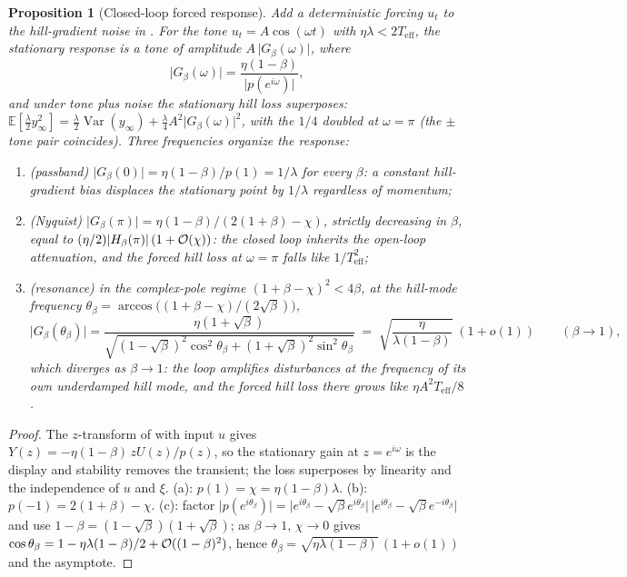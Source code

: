 \documentclass[11pt,a4paper]{article}
\newtheorem{proposition}{Proposition}
\theoremstyle{remark}
\newcommand{\Hmag}[1]{\lvert H_\beta(#1)\rvert}
\newcommand{\Teff}{T_{\mathrm{eff}}}
\begin{document}
\begin{proposition}[Closed-loop forced response]
\label{prop:forced}
Add a deterministic forcing $u_t$ to the hill-gradient noise in .
For the tone $u_t=A\cos(\omega t)$ with $\eta\lambda<2\Teff$, the stationary response is a tone of amplitude $A\,\lvert G_\beta(\omega)\rvert$, where
\[
\lvert G_\beta(\omega)\rvert=\frac{\eta(1-\beta)}{\lvert p(e^{i\omega})\rvert},
\]
and under tone plus noise the stationary hill loss superposes: $\mathbb{E}[\tfrac{\lambda}{2}y_\infty^2] =\tfrac{\lambda}{2}\operatorname{Var}(y_\infty)+\tfrac{\lambda}{4}A^2\lvert G_\beta(\omega)\rvert^2$, with the $1/4$ doubled at $\omega=\pi$ (the $\pm$ tone pair coincides).
Three frequencies organize the response:
\begin{enumerate}
\item[(a)] (passband) $\lvert G_\beta(0)\rvert=\eta(1-\beta)/p(1)=1/\lambda$ for every $\beta$: a constant hill-gradient bias displaces the stationary point by $1/\lambda$ regardless of momentum;
\item[(b)] (Nyquist) $\lvert G_\beta(\pi)\rvert=\eta(1-\beta)/(2(1+\beta)-\chi)$, strictly decreasing in $\beta$, equal to $(\eta/2)\Hmag{\pi}\,(1+\Ocal(\chi))$: the closed loop inherits the open-loop attenuation, and the forced hill loss at $\omega=\pi$ falls like $1/\Teff^2$;
\item[(c)] (resonance) in the complex-pole regime $(1+\beta-\chi)^2<4\beta$, at the hill-mode frequency $\theta_\beta=\arccos\bigl((1+\beta-\chi)/(2\sqrt\beta)\bigr)$,
  \[
  \lvert G_\beta(\theta_\beta)\rvert
  =\frac{\eta(1+\sqrt\beta)}{\sqrt{(1-\sqrt\beta)^2\cos^2\theta_\beta+(1+\sqrt\beta)^2\sin^2\theta_\beta}}
  \;=\;\sqrt{\frac{\eta}{\lambda(1-\beta)}}\;(1+o(1))\qquad(\beta\to1),
  \]
which diverges as $\beta\to1$: the loop amplifies disturbances at the frequency of its own underdamped hill mode, and the forced hill loss there grows like $\eta A^2\Teff/8$.
\end{enumerate}
\end{proposition}

\begin{proof}
The $z$-transform of  with input $u$ gives $Y(z)=-\eta(1-\beta)\,zU(z)/p(z)$, so the stationary gain at $z=e^{i\omega}$ is the display and stability removes the transient; the loss superposes by linearity and the independence of $u$ and $\xi$.
(a): $p(1)=\chi=\eta(1-\beta)\lambda$.
(b): $p(-1)=2(1+\beta)-\chi$.
(c): factor $\lvert p(e^{i\theta_\beta})\rvert=\lvert e^{i\theta_\beta}-\sqrt\beta e^{i\theta_\beta}\rvert \,\lvert e^{i\theta_\beta}-\sqrt\beta e^{-i\theta_\beta}\rvert$ and use $1-\beta=(1-\sqrt\beta)(1+\sqrt\beta)$; as $\beta\to1$, $\chi\to0$ gives $\cos\theta_\beta=1-\eta\lambda(1-\beta)/2+\mathcal{O}((1-\beta)^2)$, hence $\theta_\beta=\sqrt{\eta\lambda(1-\beta)}\,(1+o(1))$ and the asymptote.
\end{proof}
\end{document}

